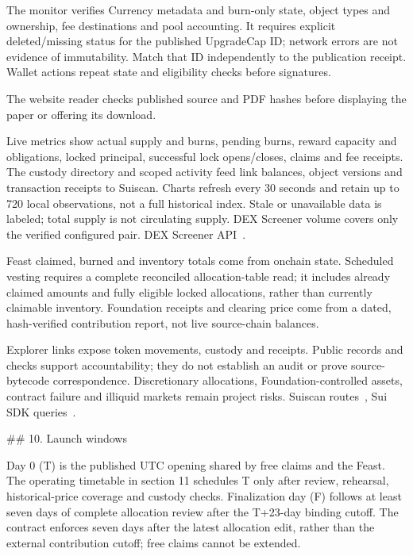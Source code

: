 \documentclass[11pt]{article}
\begin{document}
The monitor verifies Currency metadata and burn-only state, object types and ownership, fee destinations and pool accounting. It requires explicit deleted/missing status for the published UpgradeCap ID; network errors are not evidence of immutability. Match that ID independently to the publication receipt. Wallet actions repeat state and eligibility checks before signatures.

The website reader checks published source and PDF hashes before displaying the paper or offering its download.

Live metrics show actual supply and burns, pending burns, reward capacity and obligations, locked principal, successful lock opens/closes, claims and fee receipts. The custody directory and scoped activity feed link balances, object versions and transaction receipts to Suiscan. Charts refresh every 30 seconds and retain up to 720 local observations, not a full historical index. Stale or unavailable data is labeled; total supply is not circulating supply. DEX Screener volume covers only the verified configured pair. DEX Screener API~\cite{ref8}.

Feast claimed, burned and inventory totals come from onchain state. Scheduled vesting requires a complete reconciled allocation-table read; it includes already claimed amounts and fully eligible locked allocations, rather than currently claimable inventory. Foundation receipts and clearing price come from a dated, hash-verified contribution report, not live source-chain balances.

Explorer links expose token movements, custody and receipts. Public records and checks support accountability; they do not establish an audit or prove source-bytecode correspondence. Discretionary allocations, Foundation-controlled assets, contract failure and illiquid markets remain project risks. Suiscan routes~\cite{ref9}, Sui SDK queries~\cite{ref10}.

 \#\# 10. Launch windows

Day 0 (T) is the published UTC opening shared by free claims and the Feast. The operating timetable in section 11 schedules T only after review, rehearsal, historical-price coverage and custody checks. Finalization day (F) follows at least seven days of complete allocation review after the T+23-day binding cutoff. The contract enforces seven days after the latest allocation edit, rather than the external contribution cutoff; free claims cannot be extended.
\end{document}
